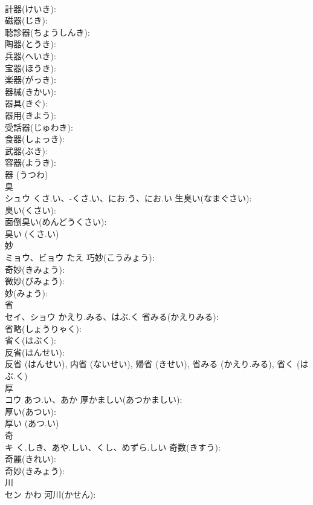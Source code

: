 \documentclass[8pt]{extreport}
\begin{document}
\begin{CJK}{UTF8}{min}
\\	計器(けいき): 
\\	磁器(じき): 
\\	聴診器(ちょうしんき): 
\\	陶器(とうき): 
\\	兵器(へいき): 
\\	宝器(ほうき): 
\\	楽器(がっき): 
\\	器械(きかい): 
\\	器具(きぐ): 
\\	器用(きよう): 
\\	受話器(じゅわき): 
\\	食器(しょっき): 
\\	武器(ぶき): 
\\	容器(ようき): 
\\	器 (うつわ)
\\	臭			
\\	シュウ	くさ.い、-くさ.い、にお.う、にお.い	生臭い(なまぐさい): 
\\	臭い(くさい): 
\\	面倒臭い(めんどうくさい): 
\\	臭い (くさ.い)
\\	妙			
\\	ミョウ、ビョウ	たえ	巧妙(こうみょう): 
\\	奇妙(きみょう): 
\\	微妙(びみょう): 
\\	妙(みょう): 
\\	省			
\\	セイ、ショウ	かえり.みる、はぶ.く	省みる(かえりみる): 
\\	省略(しょうりゃく): 
\\	省く(はぶく): 
\\	反省(はんせい): 
\\	反省 (はんせい), 内省 (ないせい), 帰省 (きせい), 省みる (かえり.みる), 省く (はぶ.く)
\\	厚			
\\	コウ	あつ.い、あか	厚かましい(あつかましい): 
\\	厚い(あつい): 
\\	厚い (あつ.い)
\\	奇			
\\	キ	く.しき、あや.しい、くし、めずら.しい	奇数(きすう): 
\\	奇麗(きれい): 
\\	奇妙(きみょう): 
\\	川			
\\	セン	かわ	河川(かせん): 

\end{CJK}
\end{document}
